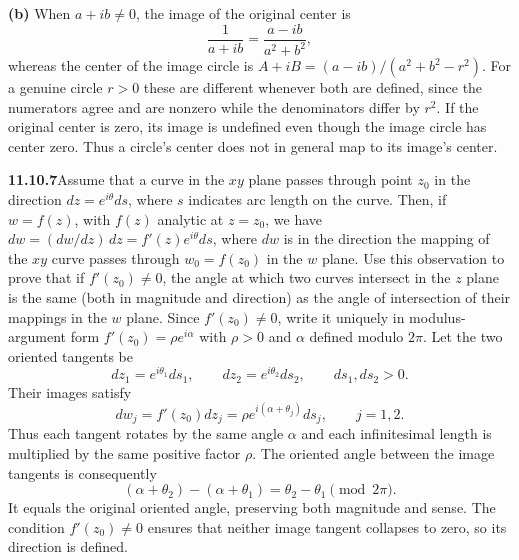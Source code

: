 \textbf{(b)} When $a+ib\ne0$, the image of the original center is
\[
\frac1{a+ib}=\frac{a-ib}{a^2+b^2},
\]
whereas the center of the image circle is
$A+iB=(a-ib)/(a^2+b^2-r^2)$. For a genuine circle $r>0$ these are
different whenever both are defined, since the numerators agree and
are nonzero while the denominators differ by $r^2$. If the original
center is zero, its image is undefined even though the image circle
has center zero.
Thus a circle's center does not in general map to its image's center.

\par\bigskip
\noindent\textbf{11.10.7}\quad Assume that a curve in the $xy$ plane passes
through point $z_{0}$ in the direction $dz=e^{i\theta}ds$, where $s$
indicates arc length on the curve. Then, if $w=f(z)$, with $f(z)$ analytic at
$z=z_{0}$, we have $dw=(dw/dz)\,dz=f'(z)e^{i\theta}ds$, where $dw$ is in the
direction the mapping of the $xy$ curve passes through $w_{0}=f(z_{0})$ in
the $w$ plane. Use this observation to prove that if $f'(z_{0})\neq0$, the
angle at which two curves intersect in the $z$ plane is the same (both in
magnitude and direction) as the angle of intersection of their mappings in
the $w$ plane.
\solution
Since $f'(z_0)\ne0$, write it uniquely in modulus-argument form
$f'(z_0)=\rho e^{i\alpha}$ with $\rho>0$ and $\alpha$ defined
modulo $2\pi$. Let the two oriented tangents be
\[
dz_1=e^{i\theta_1}ds_1,\qquad
dz_2=e^{i\theta_2}ds_2,\qquad ds_1,ds_2>0.
\]
Their images satisfy
\[
dw_j=f'(z_0)dz_j
=\rho e^{i(\alpha+\theta_j)}ds_j,\qquad j=1,2.
\]
Thus each tangent rotates by the same angle $\alpha$ and each
infinitesimal length is multiplied by the same positive factor $\rho$.
The oriented angle between the image tangents is consequently
\[
(\alpha+\theta_2)-(\alpha+\theta_1)
=\theta_2-\theta_1\pmod{2\pi}.
\]
It equals the original oriented angle, preserving both magnitude and
sense. The condition $f'(z_0)\ne0$ ensures that neither image tangent
collapses to zero, so its direction is defined.

